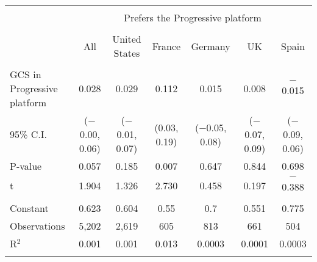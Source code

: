 
\begin{tabular}{@{\extracolsep{5pt}}lcccccc} 
\\[-1.8ex]\hline 
\hline \\[-1.8ex] 
 & \multicolumn{6}{c}{Prefers the Progressive platform} \\ 
\cline{2-7} 
\\[-1.8ex] & All & United States & France & Germany & UK & Spain \\ 
\hline \\[-1.8ex] 
 GCS in Progressive platform & 0.028 & 0.029 & 0.112 & 0.015 & 0.008 & $-$0.015 \\ 
 95\% C.I. & ($-$0.00, 0.06) & ($-$0.01, 0.07) & (0.03, 0.19) & ($-$0.05, 0.08) & ($-$0.07, 0.09) & ($-$0.09, 0.06) \\ 
 P-value & 0.057 & 0.185 & 0.007 & 0.647 & 0.844 & 0.698 \\ 
 t & 1.904 & 1.326 & 2.730 & 0.458 & 0.197 & $-$0.388 \\ 
 \hline \\[-1.8ex] 
Constant & 0.623 & 0.604 & 0.55 & 0.7 & 0.551 & 0.775 \\ 
Observations & 5,202 & 2,619 & 605 & 813 & 661 & 504 \\ 
R$^{2}$ & 0.001 & 0.001 & 0.013 & 0.0003 & 0.0001 & 0.0003 \\ 
\hline 
\hline \\[-1.8ex] 
\end{tabular} 